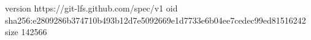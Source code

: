 version https://git-lfs.github.com/spec/v1
oid sha256:e2809286b374710b493b12d7e5092669e1d7733e6b04ee7cedec99ed81516242
size 142566
